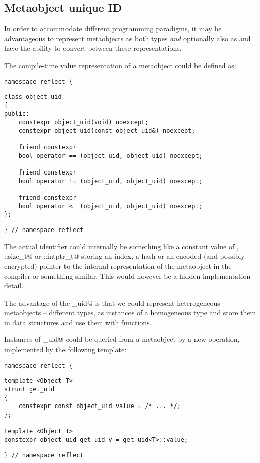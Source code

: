 \subsection{Metaobject unique ID}
\label{fut-metaobject-uid}

In order to accommodate different programming paradigms, it may be advantageous
to represent metaobjects as both types {\em and} optionally also as
 and have the ability to convert between these
representations.

The compile-time value representation of a metaobject could be defined as:

\begin{verbatim}
namespace reflect {
\end{verbatim}
\begin{verbatim}
class object_uid
{
public:
	constexpr object_uid(void) noexcept;
	constexpr object_uid(const object_uid&) noexcept;

	friend constexpr
	bool operator == (object_uid, object_uid) noexcept;

	friend constexpr
	bool operator != (object_uid, object_uid) noexcept;

	friend constexpr
	bool operator <  (object_uid, object_uid) noexcept;
};
\end{verbatim}
\begin{verbatim}
} // namespace reflect
\end{verbatim}

The actual identifier could internally be something like a constant value of
\verb@int@, \verb@std::size_t@ or \verb@std::intptr_t@ storing an index, a hash
or an encoded (and possibly encrypted) pointer to the internal representation
of the metaobject in the compiler or something similar.
This would however be a hidden implementation detail.

The advantage of the \verb@object_uid@ is that we could represent heterogeneous
metaobjects -- different types, as \verb@constexpr@ instances of a homogeneous
type and store them in \verb@constexpr@ data structures and use them with
\verb@constexpr@ functions.

Instances of \verb@object_uid@ could be queried from a metaobject by a new
operation, implemented by the following template:

\begin{verbatim}
namespace reflect {
\end{verbatim}
\begin{verbatim}
template <Object T>
struct get_uid
{
	constexpr const object_uid value = /* ... */;
};

template <Object T>
constexpr object_uid get_uid_v = get_uid<T>::value;
\end{verbatim}
\begin{verbatim}
} // namespace reflect
\end{verbatim}

